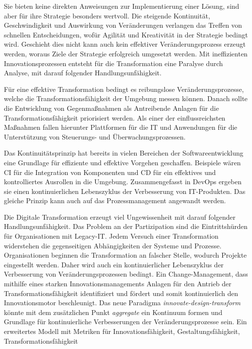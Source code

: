 \medskip
Sie bieten keine direkten Anweisungen zur Implementierung einer Lösung, sind aber für ihre Strategie besonders wertvoll. Die steigende Kontinuität, Geschwindigkeit und Auswirkung von Veränderungen verlangen das Treffen von schnellen Entscheidungen, wofür Agilität und Kreativität in der Strategie bedingt wird. Geschieht dies nicht kann auch kein effektiver Veränderungsprozess erzeugt werden, woraus Ziele der Strategie erfolgreich umgesetzt werden. Mit ineffizienten Innovationsprozessen entsteht für die Transformation eine Paralyse durch Analyse, mit darauf folgender Handlungsunfähigkeit. 

Für eine effektive Transformation bedingt es reibungslose Veränderungsprozesse, welche die Transformationsfähigkeit der Umgebung messen können. Danach sollte die Entwicklung von Gegenmaßnahmen als Antreibende Anlagen für die Transformationsfähigkeit priorisiert werden. Als einer der einflussreichsten Maßnahmen fallen hierunter Plattformen für die IT und Anwendungen für die Unterstützung von Steuerungs- und Überwachungsprozessen.

Das Kontinuitätsprinzip hat bereits in vielen Bereichen der Softwareentwicklung eine Grundlage für effiziente und effektive Vorgehen geschaffen. Beispiele wären \ac{CI} für die Integration von Komponenten und \ac{CD} für ein effektives und kontrolliertes Ausrollen in die Umgebung. Zusammengefasst in DevOps ergeben sie einen kontinuierlichen Lebenszyklus der Verbesserung von IT-Produkten. Das gleiche Prinzip kann auch auf das Prozessmanagement angewandt werden.

Die Digitale Transformation erzeugt viel Ungewissenheit mit darauf folgender Handlungsunfähigkeit. Das Problem an der Partizipation sind die Eintrittshürden für Organisationen mit Legacy-IT. Jedem Versuch einer Transformation widerstehen die gegenseitigen Abhängigkeiten der Systeme und Prozesse. Organisationen beginnen die Transformation an falscher Stelle, wodurch Projekte eingestellt werden. Daher wird auch ein kontinuierlicher Lebenszyklus der Verbesserung von Veränderungsprozessen bedingt. Ein Change-Management, dass mithilfe eines starken Innovationsmanagements Anlagen für den Antrieb der Transformationsfähigkeit identifiziert und fördert und somit kontinuierlich den Innovationsmotor beschleunigt.
Das neue Paradigma \emph{innovate-design-transform} könnte mit dem zusätzlichen Punkt \emph{aggregate} ein Kontinuum formen und Grundlage für kontinuierliche Verbesserungen der Veränderungsprozesse sein. Ein erweitertes Modell mit Metriken für Innovationsfähigkeit, Gestaltungsfähigkeit, Transformationsfähigkeit

